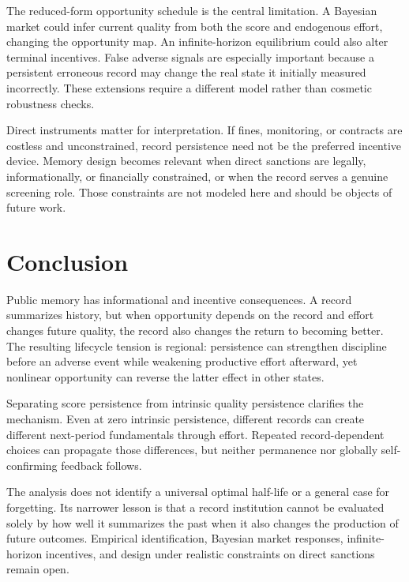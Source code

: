 \documentclass[11pt]{article}
\begin{document}
The reduced-form opportunity schedule is the central limitation. A Bayesian market could infer current quality from both the score and endogenous effort, changing the opportunity map. An infinite-horizon equilibrium could also alter terminal incentives. False adverse signals are especially important because a persistent erroneous record may change the real state it initially measured incorrectly. These extensions require a different model rather than cosmetic robustness checks.

Direct instruments matter for interpretation. If fines, monitoring, or contracts are costless and unconstrained, record persistence need not be the preferred incentive device. Memory design becomes relevant when direct sanctions are legally, informationally, or financially constrained, or when the record serves a genuine screening role. Those constraints are not modeled here and should be objects of future work.

\section{Conclusion}

Public memory has informational and incentive consequences. A record summarizes history, but when opportunity depends on the record and effort changes future quality, the record also changes the return to becoming better. The resulting lifecycle tension is regional: persistence can strengthen discipline before an adverse event while weakening productive effort afterward, yet nonlinear opportunity can reverse the latter effect in other states.

Separating score persistence from intrinsic quality persistence clarifies the mechanism. Even at zero intrinsic persistence, different records can create different next-period fundamentals through effort. Repeated record-dependent choices can propagate those differences, but neither permanence nor globally self-confirming feedback follows.

The analysis does not identify a universal optimal half-life or a general case for forgetting. Its narrower lesson is that a record institution cannot be evaluated solely by how well it summarizes the past when it also changes the production of future outcomes. Empirical identification, Bayesian market responses, infinite-horizon incentives, and design under realistic constraints on direct sanctions remain open.

\appendix




\end{document}

